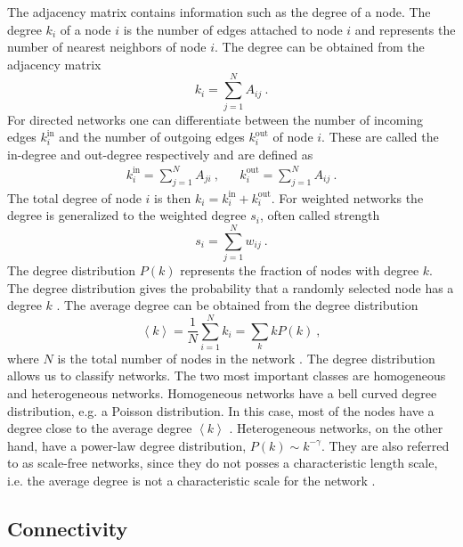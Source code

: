 \documentclass[11 pt , letterpaper , twoside , openright]{book}
\begin{document}
The adjacency matrix contains information such as the degree of a node. The degree $k_i$ of a node $i$ is the number of edges attached to node $i$ and represents the number of nearest neighbors of node $i$. The degree can be obtained from the adjacency matrix \cite{Mata2020}
\begin{equation}
	k_i = \sum_{j=1}^N A_{ij}\ .
\end{equation}
For directed networks one can differentiate between the number of incoming edges $k_i^{\textrm{in}}$ and the number of outgoing edges $k_i^{\textrm{out}}$ of node $i$. These are called the in-degree and out-degree respectively and are defined as \cite{Mata2020}
\begin{align}
	k_i^{\text{in}} = \sum_{j=1}^N A_{ji} \ , && k_i^{\text{out}} = \sum_{j=1}^N A_{ij} \ .
\end{align}
The total degree of node $i$ is then $k_i = k_i^{\text{in}} + k_i^{\text{out}}$. For weighted networks the degree is generalized to the weighted degree $s_i$, often called strength \cite{Ioannis2007}
\begin{equation}
	s_i = \sum_{j=1}^N w_{ij} \ .
\end{equation}
The degree distribution $P(k)$ represents the fraction of nodes with degree $k$. The degree distribution gives the probability that a randomly selected node has a degree $k$ \cite{Newman2003}. The average degree can be obtained from the degree distribution
\begin{equation}
	\left<k\right> = \frac{1}{N} \sum_{i=1}^N k_i = \sum_k k P(k) \ ,
\end{equation}
where $N$ is the total number of nodes in the network \cite{Mata2020}. The degree distribution allows us to classify networks. The two most important classes are homogeneous and heterogeneous networks. Homogeneous networks have a bell curved degree distribution, e.g. a Poisson distribution. In this case, most of the nodes have a degree close to the average degree $\left<k\right>$ \cite{Barabasi2016}. Heterogeneous networks, on the other hand, have a power-law degree distribution, $P(k) \sim k^{-\gamma}$. They are also referred to as scale-free networks, since they do not posses a characteristic length scale, i.e. the average degree is not a characteristic scale for the network \cite{Barabasi2016}\cite{Mata2020}.

\subsection{Connectivity}\label{connect}
\end{document}
